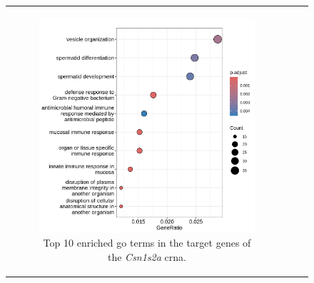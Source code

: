 \begin{figure}[H] \begin{tabular}{ccc} \begin{subfigure}{0.5\textwidth}
                  \centering

                  \includegraphics[width=\linewidth]{chapters/4_results_and_discussion/figures/dea/deseq2/letrozole/chr5:87925915-87926842_targets.txt.png}
                  \caption{Top 10 enriched \gls{go} terms in the target
                      genes of the \textit{Csn1s2a} \gls{crna}.
                  }
                  \label{fig:tg_csn1s2a}
              \end{subfigure}
        \begin{subfigure}{0.5\textwidth}
            \centering


\end{subfigure}
\end{tabular}
\end{figure}
